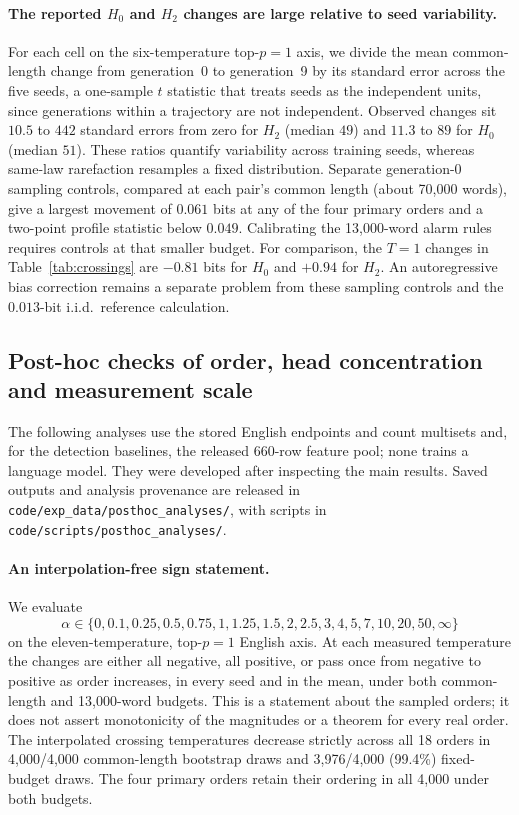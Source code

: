 \documentclass[10pt]{article}
\theoremstyle{plain}
\theoremstyle{definition}
\newcommand{\Htwo}{H_2}
\newcommand{\Hz}{H_0}
\begin{document}
\paragraph{The reported $\Hz$ and $\Htwo$ changes are large relative to seed variability.} For each cell on the
six-temperature top-$p=1$ axis, we divide the mean common-length change from generation~0 to
generation~9 by its standard error across the five seeds, a one-sample $t$ statistic that treats
seeds as the independent units, since generations within a trajectory are not independent.
Observed changes sit $10.5$ to $442$ standard errors from zero for $\Htwo$ (median $49$) and $11.3$ to $89$ for $\Hz$ (median $51$).
These ratios quantify variability across training seeds, whereas same-law rarefaction resamples
a fixed distribution. Separate generation-0 sampling controls, compared at each pair's common
length (about 70,000 words), give a largest movement of $0.061$ bits at any of the four primary orders and a
two-point profile statistic below $0.049$. Calibrating the 13,000-word alarm rules requires controls at that smaller budget. For comparison, the $T=1$ changes in
Table~\ref{tab:crossings} are $-0.81$ bits for $H_0$ and $+0.94$ for $H_2$. An autoregressive bias correction remains a separate problem from these sampling controls and
the $0.013$-bit i.i.d.\ reference calculation.


\subsection{Post-hoc checks of order, head concentration and measurement scale}
\label{app:posthocanalyses}

The following analyses use the stored English endpoints and count multisets and, for the detection baselines,
the released 660-row feature pool; none trains a language model. They were developed after inspecting the main results. Saved outputs and analysis provenance
are released in \texttt{code/exp\_data/posthoc\_analyses/}, with scripts in
\texttt{code/scripts/posthoc\_analyses/}.

\paragraph{An interpolation-free sign statement.} We evaluate
\[
\alpha\in\{0,0.1,0.25,0.5,0.75,1,1.25,1.5,2,2.5,3,4,5,7,10,20,50,\infty\}
\]
on the eleven-temperature, top-$p=1$ English axis. At each measured temperature the changes
are either all negative, all positive, or pass once from negative to positive as order increases,
in every seed and in the mean, under both common-length and 13,000-word budgets. This is a
statement about the sampled orders; it does not assert monotonicity of the magnitudes or a
theorem for every real order. The interpolated crossing temperatures decrease strictly across
all 18 orders in 4,000/4,000 common-length bootstrap draws and 3,976/4,000 (99.4\%) fixed-budget
draws. The four primary orders retain their ordering in all 4,000 under both budgets.
\end{document}
